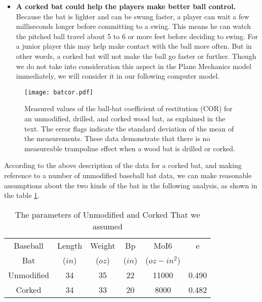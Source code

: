 \begin{itemize}
\item \textbf{A corked bat could help the players make better ball control.} Because the bat is lighter and can be swung faster, a player can wait a few milliseconds longer before committing to a swing. This means he can watch the pitched ball travel about 5 to 6 or more feet before deciding to swing. For a junior player this may help make contact with the ball more often. But in other words, a corked bat will not make the ball go faster or further. Though we do not take into consideration this aspect in the Plane Mechanics model immediately, we will consider it in our following computer model.

\end{itemize}

\begin{figure}[!htb]
\centering
\texttt{[image: batcor.pdf]}
\caption{\label{COR}Measured values of the ball-bat coefficient of restitution (COR) for an unmodified, drilled, and corked wood bat, as explained in the text. The error flags indicate the standard deviation of the mean of the measurements. These data demonstrate that there is no measureable trampoline effect when a wood bat is drilled or corked.\cite{RemarksCorked}}
\end{figure}

According to the above description of the data for a corked bat, and making reference to a number of unmodified baseball bat data, we can make reasonable assumptions about the two kinds of the bat in the following analysis, as shown in the table \ref{parametersCorked}.

\begin{table}[!htb]
\centering
\caption{\label{parametersCorked}The parameters of Unmodified and Corked That we assumed}
\begin{tabular}{|l|l|l|l|l|l|}
\hline
\multicolumn{1}{|c|}{Baseball } & \multicolumn{1}{c|}{Length} & \multicolumn{1}{c|}{Weight} & \multicolumn{1}{c|}{Bp} & \multicolumn{1}{c|}{MoI6} & \multicolumn{1}{c|}{e} \\
\multicolumn{1}{|c|}{Bat} & \multicolumn{1}{c|}{($in$)} & \multicolumn{1}{c|}{($oz$)} & \multicolumn{1}{c|}{($in$)} & \multicolumn{1}{c|}{($oz-in^2$)} & \multicolumn{1}{c|}{} \\
\hline
\multicolumn{1}{|c|}{Unmodified} & \multicolumn{1}{c|}{34} & \multicolumn{1}{c|}{35} & \multicolumn{1}{c|}{22} & \multicolumn{1}{c|}{11000} & \multicolumn{1}{c|}{0.490} \\
\hline
\multicolumn{1}{|c|}{Corked} & \multicolumn{1}{c|}{34} & \multicolumn{1}{c|}{33} & \multicolumn{1}{c|}{20} & \multicolumn{1}{c|}{8000} & \multicolumn{1}{c|}{0.482} \\
\hline
\end{tabular}
\end{table}

